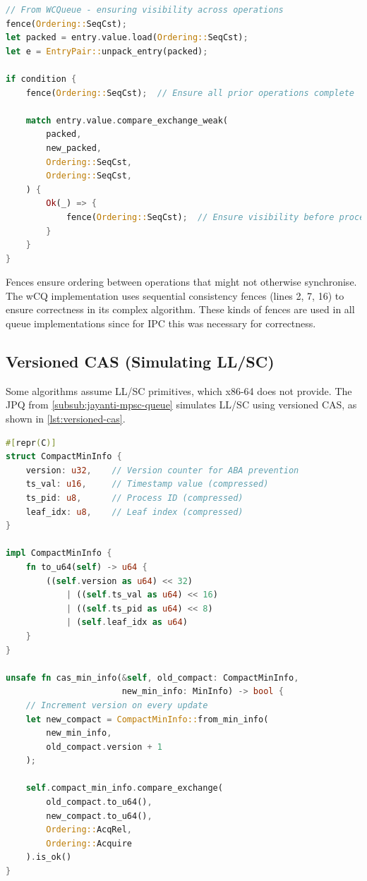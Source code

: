 \begin{lstlisting}[language=Rust, style=boxed, caption={Explicit memory fence usage}, label={lst:memory-fences}]
// From WCQueue - ensuring visibility across operations
fence(Ordering::SeqCst);
let packed = entry.value.load(Ordering::SeqCst);
let e = EntryPair::unpack_entry(packed);

if condition {
    fence(Ordering::SeqCst);  // Ensure all prior operations complete
    
    match entry.value.compare_exchange_weak(
        packed,
        new_packed,
        Ordering::SeqCst,
        Ordering::SeqCst,
    ) {
        Ok(_) => {
            fence(Ordering::SeqCst);  // Ensure visibility before proceeding
        }
    }
}
\end{lstlisting}

Fences ensure ordering between operations that might not otherwise synchronise. The \ac{wCQ} implementation uses sequential consistency fences (lines 2, 7, 16) to ensure correctness in its complex algorithm. These kinds of fences are used in all queue implementations since for \ac{IPC} this was necessary for correctness. 

\subsection{Versioned \acf{CAS} (Simulating \acf{LL/SC})}

Some algorithms assume \ac{LL/SC} primitives, which x86-64 does not provide. The \ac{JPQ} from \cref{subsub:jayanti-mpsc-queue} simulates \ac{LL/SC} using versioned \ac{CAS}, as shown in \cref{lst:versioned-cas}.

\begin{lstlisting}[language=Rust, style=boxed, caption={Versioned CAS for LL/SC simulation}, label={lst:versioned-cas}]
#[repr(C)]
struct CompactMinInfo {
    version: u32,    // Version counter for ABA prevention
    ts_val: u16,     // Timestamp value (compressed)
    ts_pid: u8,      // Process ID (compressed)  
    leaf_idx: u8,    // Leaf index (compressed)
}

impl CompactMinInfo {
    fn to_u64(self) -> u64 {
        ((self.version as u64) << 32)
            | ((self.ts_val as u64) << 16)
            | ((self.ts_pid as u64) << 8)
            | (self.leaf_idx as u64)
    }
}

unsafe fn cas_min_info(&self, old_compact: CompactMinInfo, 
                       new_min_info: MinInfo) -> bool {
    // Increment version on every update
    let new_compact = CompactMinInfo::from_min_info(
        new_min_info, 
        old_compact.version + 1
    );
    
    self.compact_min_info.compare_exchange(
        old_compact.to_u64(),
        new_compact.to_u64(),
        Ordering::AcqRel,
        Ordering::Acquire
    ).is_ok()
}
\end{lstlisting}

